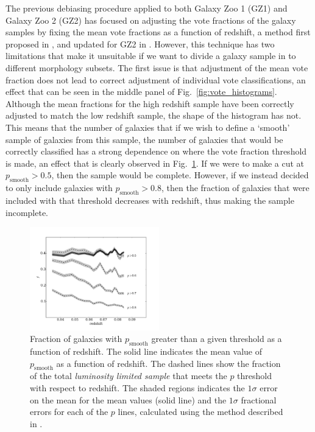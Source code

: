 \documentclass[useAMS,usenatbib]{mn2e}
\begin{document}
The previous debiasing procedure applied to both Galaxy Zoo 1 (GZ1) and Galaxy Zoo 2 (GZ2) has focused on adjusting the vote fractions of the galaxy samples by fixing the mean vote fractions as a function of redshift, a method first proposed in \cite{Bamford_09}, and updated for GZ2 in \citep{Willett_13}. However, this technique has two limitations that make it unsuitable if we want to divide a galaxy sample in to different morphology subsets. The first issue is that adjustment of the mean vote fraction does not lead to correct adjustment of individual vote classifications, an effect that can be seen in the middle panel of Fig.~\ref{fig:vote_histograms}. Although the mean fractions for the high redshift sample have been correctly adjusted to match the low redshift sample, the shape of the histogram has not. This means that the number of galaxies that if we wish to define a `smooth' sample of galaxies from this sample, the number of galaxies that would be correctly classified has a strong dependence on where the vote fraction threshold is made, an effect that is clearly observed in Fig.~\ref{fig:p_bias}. If we were to make a cut at $p_{\textrm{smooth}} > 0.5$, then the sample would be complete. However, if we instead decided to only include galaxies with $p_{\textrm{smooth}} > 0.8$, then the fraction of galaxies that were included with that threshold decreases with redshift, thus making the sample incomplete.

\begin{figure}
		\centering

        \includegraphics[width=0.5\textwidth]{Data_imgs/p_bias.pdf}

        \caption{Fraction of galaxies with $p_{\textrm{smooth}}$ greater than a given threshold as a function of redshift. The solid line indicates the mean value of $p_{\textrm{smooth}}$ as a function of redshift. The dashed lines show the fraction of the total \textit{luminosity limited sample} that meets the $p$ threshold with respect to redshift. The shaded regions indicates the $1 \sigma$ error on the mean for the mean values (solid line) and the $1 \sigma$ fractional errors for each of the $p$ lines, calculated using the method described in \citet{Cameron_11}.}

        \label{fig:p_bias}

\end{figure}
\end{document}
